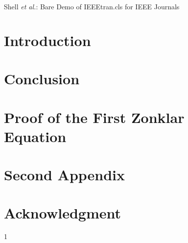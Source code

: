 \documentclass[journal]{IEEEtran}
\begin{document}
\title{}

\author{}

%
{Shell \MakeLowercase{\textit{et al.}}: Bare Demo of IEEEtran.cls for IEEE Journals}

\maketitle

\begin{abstract}

\end{abstract}

\begin{IEEEkeywords}

\end{IEEEkeywords}

\IEEEpeerreviewmaketitle

\section{Introduction}


\section{Conclusion}


\appendices
\section{Proof of the First Zonklar Equation}


\section{Second Appendix}


\section*{Acknowledgment}


\ifCLASSOPTIONcaptionsoff
  \newpage
\fi

\begin{thebibliography}{1}

\end{thebibliography}


\end{document}
